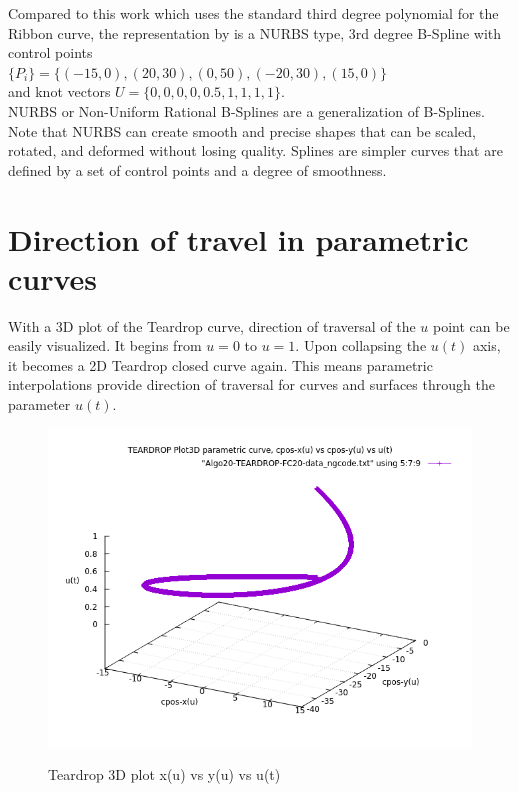 Compared to this work which uses the standard third degree polynomial for the Ribbon curve, the representation by \cite{Zhong-etal:2018} is a NURBS type, 3rd degree B-Spline with control points\\

$\{P_{i}\} = \{ (-15,0), (20,30), (0,50), (-20,30), (15,0)  \}$ \\
and knot vectors $U = \{0, 0, 0, 0, 0.5, 1, 1, 1, 1\}$.\\

NURBS or Non-Uniform Rational B-Splines are a generalization of B-Splines. Note that NURBS can create smooth and precise shapes that can be scaled, rotated, and deformed without losing quality. Splines are simpler curves that are defined by a set of control points and a degree of smoothness.\\



\clearpage
\pagebreak

\section{Direction of travel in parametric curves}

With a 3D plot of the Teardrop curve, direction of traversal of the $u$ point can be easily visualized. It begins from $u=0$ to $u=1$. Upon collapsing the $u(t)$ axis, it becomes a 2D Teardrop closed curve again. This means parametric interpolations provide direction of traversal for curves and surfaces through the parameter $u(t)$. \\

\begin{figure}
	\includegraphics[width=1.10\textwidth]{Chap4/images/TEARDROP-plot-3D-x-vs-y-vs-u.png} 
	\label{TEARDROP-plot3D-data_ngcode.png}
	\caption{Teardrop 3D plot x(u) vs y(u) vs u(t)}
\end{figure}

